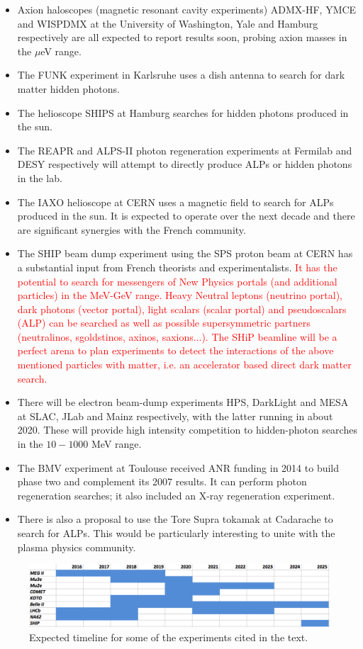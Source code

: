 \begin{itemize}
\item Axion haloscopes (magnetic resonant cavity experiments) ADMX-HF, YMCE and WISPDMX at the University of Washington, Yale and Hamburg respectively are all expected to report results soon, probing axion masses in the $\mu$eV range. 
\item The FUNK experiment in Karlsruhe uses a dish antenna to search for dark matter hidden photons.
\item The helioscope SHIPS at Hamburg searches for hidden photons produced in the sun.
\item The REAPR and ALPS-II photon regeneration experiments at Fermilab and DESY respectively will attempt to directly produce ALPs or hidden photons in the lab.
\item The IAXO helioscope at CERN uses a magnetic field to search for ALPs produced in the sun. It is expected to operate over the next decade and there are significant synergies with the French community.
\item The SHIP  beam dump experiment using the SPS proton beam at CERN has a substantial input from French theorists and experimentalists.  
\textcolor{red}{It has the potential to search for messengers of New Physics portals (and additional particles) in the MeV-GeV range. Heavy Neutral leptons (neutrino portal), dark photons (vector portal), light scalars (scalar portal) and pseudoscalars (ALP) can be searched as well as possible supersymmetric partners (neutralinos, sgoldstinos, axinos, saxions...).  The SHiP beamline will be a perfect arena to plan experiments to detect the interactions of the above mentioned particles with matter, i.e. an accelerator based direct dark matter search.}
\item There will be electron beam-dump experiments HPS, DarkLight and MESA at SLAC, JLab and Mainz respectively, with the latter running in about 2020. These will provide high intensity competition to hidden-photon searches in the $10-1000$ MeV range.
\item The BMV experiment at Toulouse received ANR funding in 2014 to build phase two and complement its 2007 results. It can perform photon regeneration searches; it also included an X-ray regeneration experiment.
\item There is also a proposal to use the Tore Supra tokamak at Cadarache to search for ALPs. This would be particularly interesting to unite with the plasma physics community. 
\end{itemize}




\begin{figure}[!htb]
\begin{center}
\includegraphics[width=12cm]{timeline.pdf}
\end{center}
\caption{Expected timeline for some of the experiments cited in the text.}%
\label{figphis}%
\end{figure}


